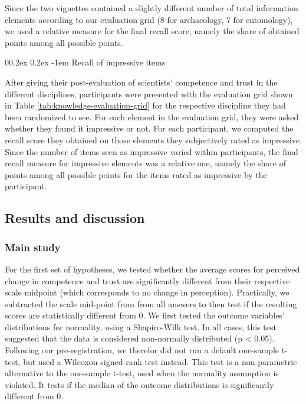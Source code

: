 \documentclass[
  doc,floatsintext]{apa6}
\makeatletter
\let\oldparagraph\paragraph
\renewcommand{\paragraph}{
    \@ifstar
      \xxxParagraphStar
      \xxxParagraphNoStar
  }
\newcommand{\xxxParagraphStar}[1]{\oldparagraph*{#1}\mbox{}}
\newcommand{\xxxParagraphNoStar}[1]{\oldparagraph{#1}\mbox{}}
\renewcommand{\paragraph}{\@startsection{paragraph}{4}{\parindent}%
  {0\baselineskip \@plus 0.2ex \@minus 0.2ex}%
  {-1em}%
  {\normalfont\normalsize\bfseries\itshape\typesectitle}}
\makeatother
\begin{document}
Since the two vignettes contained a slightly different number of total information elements according to our evaluation grid (8 for archaeology, 7 for entomology), we used a relative measure for the final recall score, namely the share of obtained points among all possible points.

\paragraph{Recall of impressive items}\label{recall-of-impressive-items}

After giving their post-evaluation of scientists' competence and trust in the different disciplines, participants were presented with the evaluation grid shown in Table \ref{tab:knowledge-evaluation-grid} for the respective discipline they had been randomized to see. For each element in the evaluation grid, they were asked whether they found it impressive or not. For each participant, we computed the recall score they obtained on those elements they subjectively rated as impressive. Since the number of items seen as impressive varied within participants, the final recall measure for impressive elements was a relative one, namely the share of points among all possible points for the items rated as impressive by the participant.

\subsection{Results and discussion}\label{results-and-discussion-1}

\subsubsection{Main study}\label{main-study-1}

For the first set of hypotheses, we tested whether the average scores for perceived change in competence and trust are significantly different from their respective scale midpoint (which corresponds to no change in perception). Practically, we subtracted the scale mid-point from from all answers to then test if the resulting scores are statistically different from 0. We first tested the outcome variables' distributions for normality, using a Shapiro-Wilk test. In all cases, this test suggested that the data is considered non-normally distributed (p \textless{} 0.05). Following our pre-registration, we therefor did not run a default one-sample t-test, but used a Wilcoxon signed-rank test instead. This test is a non-parametric alternative to the one-sample t-test, used when the normality assumption is violated. It tests if the median of the outcome distributions is significantly different from 0.
\end{document}

